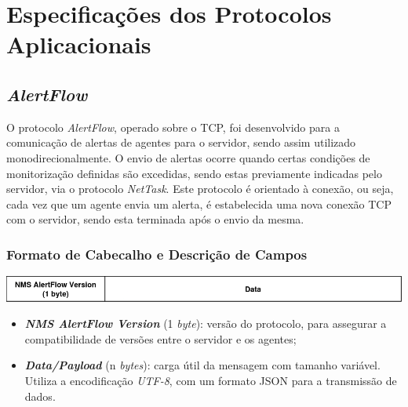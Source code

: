 \documentclass[a4paper,12pt]{scrreprt}
\begin{document}



\chapter{Especificações dos Protocolos Aplicacionais}

\section{\textit{AlertFlow}}

O protocolo \textit{AlertFlow}, operado sobre o TCP, foi desenvolvido para a
comunicação de alertas de
agentes para o servidor, sendo assim utilizado monodirecionalmente. O envio de
alertas ocorre quando certas condições de monitorização definidas são excedidas,
sendo estas previamente indicadas pelo servidor, via o protocolo \textit{NetTask}.
Este protocolo é orientado à conexão, ou seja, cada vez que um agente envia um alerta,
é estabelecida uma nova conexão TCP com o servidor, sendo esta terminada após o envio
da mesma.

\subsection{Formato de Cabecalho e Descrição de Campos}

\begin{minipage}{\textwidth}
    \centering
    \includegraphics[width=\textwidth]{img/alertflow_header.png}
    \label{fig:alertflow_message_format}
\end{minipage}

\begin{itemize}
    \item \textbf{\textit{NMS AlertFlow Version}} (1 \textit{byte}): versão do protocolo,
        para assegurar a compatibilidade de versões entre o servidor e os agentes;
    \item \textbf{\textit{Data/Payload}} (n \textit{bytes}): carga útil da mensagem com
        tamanho variável. Utiliza a encodificação \textit{UTF-8}, com um formato JSON
        para a transmissão de dados.
\end{itemize}
\end{document}
